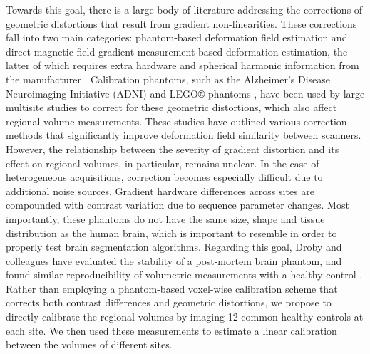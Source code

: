 Towards this goal, there is a large body of literature addressing the corrections of geometric distortions that result from gradient non-linearities. These corrections fall into two main categories: phantom-based deformation field estimation and direct magnetic field gradient measurement-based deformation estimation, the latter of which requires extra hardware and spherical harmonic information from the manufacturer \cite{fonov2010improved}. Calibration phantoms, such as the Alzheimer's Disease Neuroimaging Initiative (ADNI) \cite{gunter2009measurement} and LEGO® phantoms \cite{caramanos2010gradient}, have been used by large multisite studies to correct for these geometric distortions, which also affect regional volume measurements. These studies have outlined various correction methods that significantly improve deformation field similarity between scanners. However, the relationship between the severity of gradient distortion and its effect on regional volumes, in particular, remains unclear. In the case of heterogeneous acquisitions, correction becomes especially difficult due to additional noise sources. Gradient hardware differences across sites are compounded with contrast variation due to sequence parameter changes. Most importantly, these phantoms do not have the same size, shape and tissue distribution as the human brain, which is important to resemble in order to properly test brain segmentation algorithms. Regarding this goal, Droby and colleagues have evaluated the stability of a post-mortem brain phantom, and found similar reproducibility of volumetric measurements with a healthy control \cite{droby2015human}. Rather than employing a phantom-based voxel-wise calibration scheme that corrects both contrast differences and geometric distortions, we propose to directly calibrate the regional volumes by imaging 12 common healthy controls at each site. We then used these measurements to estimate a linear calibration between the volumes of different sites.